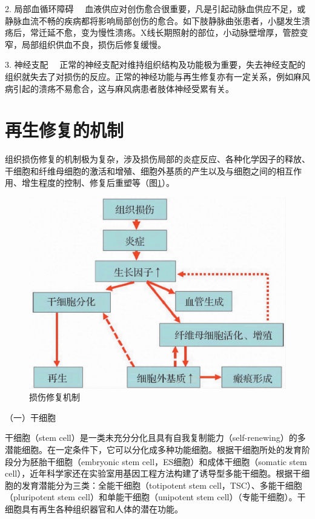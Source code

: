 {2. 局部血循环障碍}
　血液供应对创伤愈合很重要，凡是引起动脉血供应不足，或静脉血流不畅的疾病都将影响局部创伤的愈合。如下肢静脉曲张患者，小腿发生溃疡后，常迁延不愈，变为慢性溃疡。X线长期照射的部位，小动脉壁增厚，管腔变窄，局部组织供血不良，损伤后修复缓慢。

{3. 神经支配}
　正常的神经支配对维持组织结构及功能极为重要，失去神经支配的组织就失去了对损伤的反应。正常的神经功能与再生修复亦有一定关系，例如麻风病引起的溃疡不易愈合，这与麻风病患者肢体神经受累有关。

\section{再生修复的机制}

组织损伤修复的机制极为复杂，涉及损伤局部的炎症反应、各种化学因子的释放、干细胞和纤维母细胞的激活和增殖、细胞外基质的产生以及与细胞之间的相互作用、增生程度的控制、修复后重塑等（图\ref{fig2-10}）。

\begin{figure}[!htbp]
\centering
\includegraphics{./images/Image00033.jpg}
\caption{损伤修复机制}
\label{fig2-10} 
\end{figure} 


{（一）干细胞}

干细胞（stem
cell）是一类未充分分化且具有自我复制能力（self-renewing）的多潜能细胞。在一定条件下，它可以分化成多种功能细胞。根据干细胞所处的发育阶段分为胚胎干细胞（embryonic
stem cell，ES细胞）和成体干细胞（somatic stem
cell），近年科学家还在实验室用基因工程方法构建了诱导型多能干细胞。根据干细胞的发育潜能分为三类：全能干细胞（totipotent
stem cell，TSC）、多能干细胞（pluripotent stem
cell）和单能干细胞（unipotent stem
cell）（专能干细胞）。干细胞具有再生各种组织器官和人体的潜在功能。

